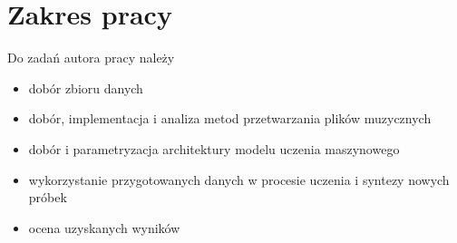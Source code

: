 {    \section{Zakres pracy}
    {
        Do zadań autora pracy należy
        \begin{itemize}
            \item dobór zbioru danych
            \item dobór, implementacja i analiza metod przetwarzania plików muzycznych
            \item dobór i parametryzacja architektury modelu uczenia maszynowego
            \item wykorzystanie przygotowanych danych 
            w procesie uczenia i syntezy nowych próbek
            \item ocena uzyskanych wyników
        \end{itemize}
    }
}


